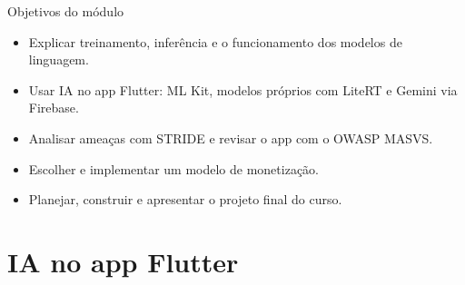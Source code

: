 \documentclass[aspectratio=169,10pt]{beamer}
\begin{document}
\capa

\begin{frame}{Objetivos do módulo}
  \begin{conceito}
    \begin{itemize}
      \item Explicar treinamento, inferência e o funcionamento dos modelos de linguagem.
      \item Usar IA no app Flutter: ML Kit, modelos próprios com LiteRT e Gemini via Firebase.
      \item Analisar ameaças com STRIDE e revisar o app com o OWASP MASVS.
      \item Escolher e implementar um modelo de monetização.
      \item Planejar, construir e apresentar o projeto final do curso.
    \end{itemize}
  \end{conceito}
\end{frame}

\sumario



\section{IA no app Flutter}
\end{document}
